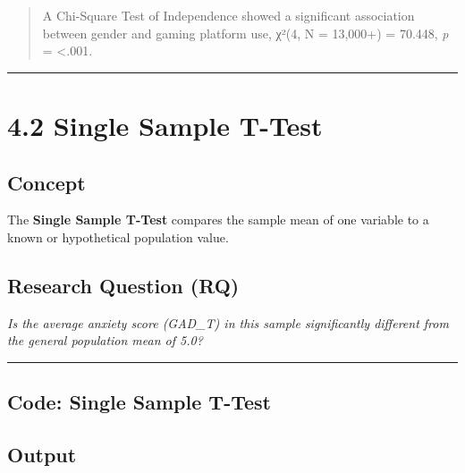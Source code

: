 \documentclass[
]{book}
\newenvironment{Shaded}{\begin{snugshade}}{\end{snugshade}}
\newcommand{\AttributeTok}[1]{\textcolor[rgb]{0.13,0.29,0.53}{#1}}
\newcommand{\DecValTok}[1]{\textcolor[rgb]{0.00,0.00,0.81}{#1}}
\newcommand{\FunctionTok}[1]{\textcolor[rgb]{0.13,0.29,0.53}{\textbf{#1}}}
\newcommand{\NormalTok}[1]{#1}
\newcommand{\SpecialCharTok}[1]{\textcolor[rgb]{0.81,0.36,0.00}{\textbf{#1}}}
\begin{document}
\begin{quote}
A Chi-Square Test of Independence showed a significant association between gender and gaming platform use, χ²(4, N = 13,000+) = 70.448, \emph{p} = \textless.001.
\end{quote}

\begin{center}\rule{0.5\linewidth}{0.5pt}\end{center}

\section{4.2 Single Sample T-Test}\label{single-sample-t-test}

\subsection{Concept}\label{concept-1}

The \textbf{Single Sample T-Test} compares the sample mean of one variable to a known or hypothetical population value.

\subsection{Research Question (RQ)}\label{research-question-rq-1}

\emph{Is the average anxiety score (GAD\_T) in this sample significantly different from the general population mean of 5.0?}

\begin{center}\rule{0.5\linewidth}{0.5pt}\end{center}

\subsection{Code: Single Sample T-Test}\label{code-single-sample-t-test}

\begin{Shaded}
\end{Shaded}

\subsection{Output}\label{output-1}
\end{document}
